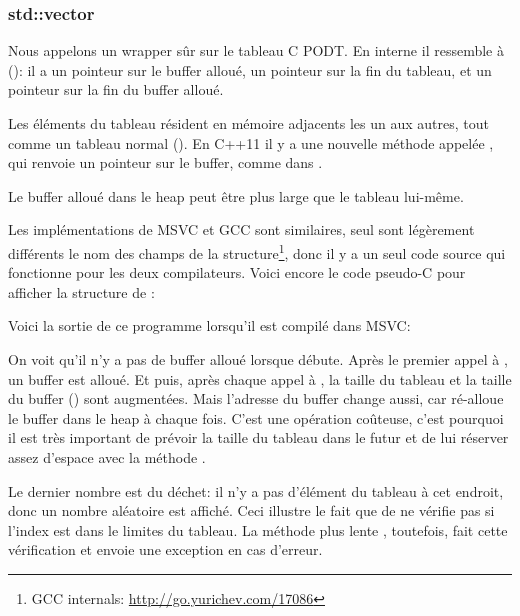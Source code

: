 \subsubsection{std::vector}

Nous appelons  un wrapper sûr sur le tableau C \ac{PODT}.
En interne il ressemble à  ():
il a un pointeur sur le buffer alloué, un pointeur sur la fin du tableau, et un pointeur
sur la fin du buffer alloué.

Les éléments du tableau résident en mémoire adjacents les un aux autres, tout comme
un tableau normal ().
En C++11 il y a une nouvelle méthode appelée , qui renvoie un pointeur
sur le buffer, comme  dans .

Le buffer alloué dans le \gls{heap} peut être plus large que le tableau lui-même.

Les implémentations de MSVC et GCC sont similaires, seul sont légèrement différents
le nom des champs de la structure\footnote{GCC internals: \url{http://go.yurichev.com/17086}},
donc il y a un seul code source qui fonctionne pour les deux compilateurs.
Voici encore le code pseudo-C pour afficher la structure de :



Voici la sortie de ce programme lorsqu'il est compilé dans MSVC:



On voit qu'il n'y a pas de buffer alloué lorsque \main débute.
Après le premier appel à , un buffer est alloué.
Et puis, après chaque appel à , la taille du tableau et la taille
du buffer () sont augmentées.
Mais l'adresse du buffer change aussi, car  ré-alloue le buffer dans
le \gls{heap} à chaque fois.
C'est une opération coûteuse, c'est pourquoi il est très important de prévoir la
taille du tableau dans le futur et de lui réserver assez d'espace avec la méthode
.

Le dernier nombre est du déchet: il n'y a pas d'élément du tableau à cet endroit,
donc un nombre aléatoire est affiché.
Ceci illustre le fait que  de  ne vérifie pas si l'index
est dans le limites du tableau.
La méthode plus lente , toutefois, fait cette vérification et envoie une
exception  en cas d'erreur.


